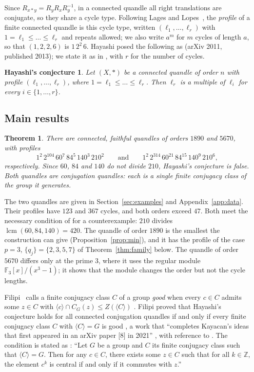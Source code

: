 \documentclass[11pt]{article}
\newtheorem{theorem}{Theorem}[section]
\newtheorem*{hconj}{Hayashi's conjecture}
\newcommand{\F}{\mathbb{F}}
\begin{document}
Since $R_{x*y}=R_yR_xR_y^{-1}$, in a connected quandle all right
translations are conjugate, so they share a cycle type. Following Lages
and Lopes~\cite{LL}, the \emph{profile} of a finite connected quandle is
this cycle type, written $(\ell_1,\dots,\ell_r)$ with
$1=\ell_1\le\dots\le\ell_r$ and repeats allowed; we also write $a^m$ for
$m$ cycles of length $a$, so that $(1,2,2,6)$ is $1\,2^2\,6$. Hayashi
posed the following as \cite[Conjecture~1.1]{Ha} (arXiv 2011, published
2013); we state it as in \cite[Conjecture~1.6]{LL}, with $r$ for the number of cycles.

\begin{hconj}
Let $(X,*)$ be a connected quandle of order $n$ with profile
$(\ell_1,\dots,\ell_r)$, where $1=\ell_1\le\dots\le\ell_r$. Then $\ell_r$
is a multiple of $\ell_i$ for every $i\in\{1,\dots,r\}$.
\end{hconj}

\subsection{Main results}

\begin{theorem}\label{thm:main}
There are connected, faithful quandles of orders $1890$ and $5670$, with
profiles
\[
1^{2}\,2^{104}\,60^{7}\,84^{5}\,140^{3}\,210^{2}
\qquad\text{and}\qquad
1^{2}\,2^{314}\,60^{21}\,84^{15}\,140^{9}\,210^{6},
\]
respectively. Since $60$, $84$ and $140$ do not divide $210$, Hayashi's
conjecture is false. Both quandles are conjugation quandles: each is a
single finite conjugacy class of the group it generates.
\end{theorem}

The two quandles are given in Section~\ref{sec:examples} and
Appendix~\ref{app:data}. Their profiles have $123$ and $367$ cycles, and
both orders exceed $47$. Both meet the necessary condition of
\cite[Corollary~2.6]{LL} for a counterexample: $210$ divides
$\operatorname{lcm}(60,84,140)=420$. The quandle of order $1890$ is the
smallest the construction can give (Proposition~\ref{prop:min}), and it has
the profile of the case $p=3$, $\{q_j\}=\{2,3,5,7\}$ of
Theorem~\ref{thm:family} below. The quandle of order $5670$ differs only at
the prime $3$, where it uses the regular module $\F_3[x]/(x^3-1)$; it shows
that the module changes the order but not the cycle lengths.

Filipi~\cite{F} calls a finite conjugacy class $C$ of a group \emph{good}
when every $c\in C$ admits some $z\in C$ with
$\langle c\rangle\cap C_G(z)\le Z(\langle C\rangle)$
\cite[Definition~4.1]{F}. Filipi proved that Hayashi's conjecture holds for
all connected conjugation quandles if and only if every finite conjugacy
class $C$ with $\langle C\rangle=G$ is good \cite[Theorem~4.1]{F}, a work
that ``completes Kayacan's ideas that first appeared in an arXiv paper [8]
in 2021'' \cite[\S1]{F}, with reference to \cite{K}. The condition is
stated as \cite[Conjecture~4.1]{F}: ``Let $G$ be a group and $C$ its
finite conjugacy class such that $\langle C\rangle=G$. Then for any $c\in
C$, there exists some $z\in C$ such that for all $k\in\mathbb{Z}$, the
element $c^k$ is central if and only if it commutes with $z$.''
\end{document}
